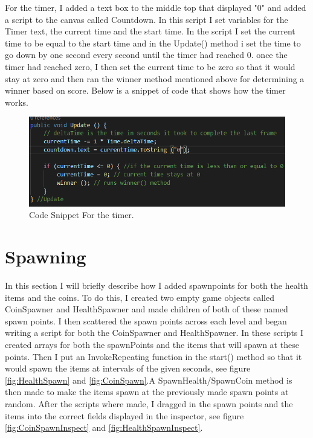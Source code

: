 For the timer, I added a text box to the middle top that displayed "0" and added a script to the canvas called Countdown. In this script I set variables for the Timer text, the current time and the start time. In the script I set the current time to be equal to the start time and in the Update() method i set the time to go down by one second every second until the timer had reached 0. once the timer had reached zero, I then set the current time to be zero so that it would stay at zero and then ran the winner method mentioned above for determining a winner based on score. Below is a snippet of code that shows how the timer works.
\begin{figure}[h]
\centering
  \includegraphics[width= 1\linewidth]{Images/Timer.PNG}
  \caption{Code Snippet For the timer.}
  \label{fig:Timer}
\end{figure}

\section{Spawning}
In this section I will briefly describe how I added spawnpoints for both the health items and the coins. To do this, I created two empty game objects called CoinSpawner and HealthSpawner and made children of both of these named spawn points. I then scattered the spawn points across each level and began writing a script for both the CoinSpawner and HealthSpawner. In these scripts I created arrays for both the spawnPoints and the items that will spawn at these points. Then I put an InvokeRepeating function in the start() method so that it would spawn the items at intervals of the given seconds, see figure \ref{fig:HealthSpawn} and \ref{fig:CoinSpawn}.A SpawnHealth/SpawnCoin method is then made to make the items spawn at the previously made spawn points at random. After the scripts where made, I dragged in the spawn points and the items into the correct fields displayed in the inspector, see figure \ref{fig:CoinSpawnInspect} and \ref{fig:HealthSpawnInspect}.

